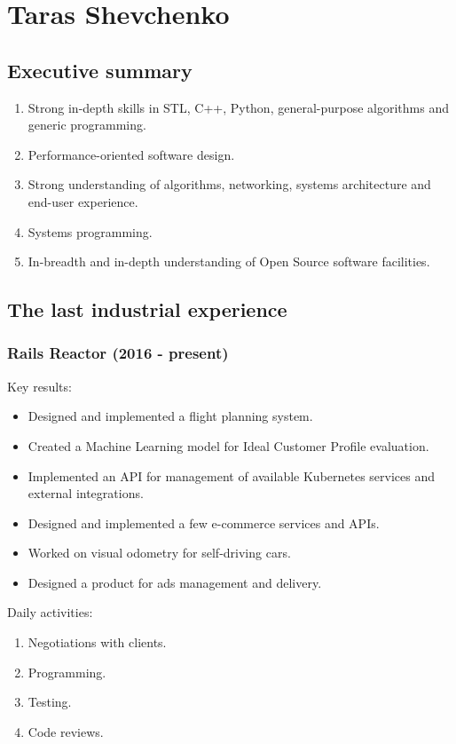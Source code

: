 \documentclass[a4paper,12pt,final]{extreport}
\begin{document}
\section{Taras Shevchenko}
\subsection{Executive summary}
\begin{enumerate}
  \item Strong in-depth skills in STL, C++, Python, general-purpose algorithms and generic programming.
  \item Performance-oriented software design.
  \item Strong understanding of algorithms, networking, systems architecture and end-user experience.
  \item Systems programming.
  \item In-breadth and in-depth understanding of Open Source software facilities.
\end{enumerate}

\subsection{The last industrial experience}
\subsubsection{Rails Reactor (2016 - present)}
Key results:
\begin{itemize}
  \item Designed and implemented a flight planning system.
  \item Created a Machine Learning model for Ideal Customer Profile evaluation.
  \item Implemented an API for management of available Kubernetes services and external integrations.
  \item Designed and implemented a few e-commerce services and APIs.
  \item Worked on visual odometry for self-driving cars.  
  \item Designed a product for ads management and delivery.
\end{itemize}
Daily activities:
\begin{enumerate}
    \item Negotiations with clients.
    \item Programming.
    \item Testing.
    \item Code reviews.
\end{enumerate}
\end{document}
